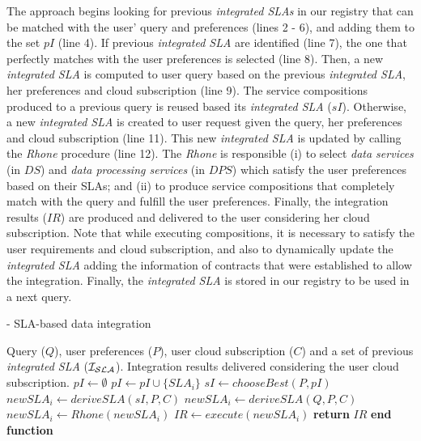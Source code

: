 The approach begins looking for previous \textit{integrated SLAs} in our registry that can be matched with the user' query and preferences (lines 2 - 6), and adding them to the set $pI$ (line 4). 
%
If previous \textit{integrated SLA} are identified (line 7), the one that perfectly matches with the user preferences is selected (line 8). 
%
Then, a new \textit{integrated SLA} is computed to user query based on the previous \textit{integrated SLA}, her preferences and cloud subscription (line 9). 
%
The service compositions produced to a previous query is reused based its \textit{integrated SLA} ($sI$). 
%
Otherwise, a new \textit{integrated SLA} is created to user request given the query, her preferences and cloud subscription (line 11). 
%
This new \textit{integrated SLA} is updated by calling the \textit{Rhone} procedure (line 12). 
%
The \textit{Rhone} is responsible (i) to select \textit{data services} (in $DS$) and \textit{data processing services} (in $DPS$) which satisfy the user preferences based on their SLAs; and (ii) to produce service compositions that completely match with the query and fulfill the user preferences. 
%
Finally, the integration results ($IR$) are produced and delivered to the user considering her cloud subscription. 
%
Note that while executing compositions, it is necessary to satisfy the user requirements and cloud subscription, and also to dynamically update the \textit{integrated SLA} adding the information of contracts that were established to allow the integration. 
%
Finally, the \textit{integrated SLA} is stored in our registry to be used in a next query.   

\begin{algorithm} 
\caption{ - SLA-based data integration}
\label{qualityBasedAlgorithm}
\begin{algorithmic}[1]
\REQUIRE Query ($Q$), user preferences ($P$), user cloud subscription ($C$) and a set of previous \textit{integrated SLA} ($\bigSLA$).
\ENSURE Integration results delivered considering the user cloud subscription.
\STATE $pI \leftarrow \emptyset$
		\STATE $pI \leftarrow pI \cup \lbrace SLA_{i} \rbrace$		
	\ENDIF
\ENDFOR
{}
	\STATE $sI \leftarrow chooseBest(P, pI)$
	\STATE $newSLA_{i} \leftarrow deriveSLA(sI, P, C)$
\ELSE
	\STATE $newSLA_{i} \leftarrow deriveSLA(Q, P, C)$
	\STATE $newSLA_{i} \leftarrow Rhone(newSLA_{i})$
\ENDIF
\STATE $IR \leftarrow execute(newSLA_{i})$
\STATE \textbf{return} $IR$
\STATE \textbf{end function}
\end{algorithmic}
\end{algorithm} 

